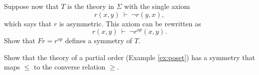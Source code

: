 \begin{exercise} Suppose now that $T$ is the theory in $\Sigma$ with
  the single axiom
  \[ r(x,y)\: \vdash \: \neg r(y,x) ,\] which says that $r$ is
  asymmetric.  This axiom can be rewritten as
  \[ r(x,y)\: \vdash \: \neg r^{op}(x,y) .\] Show that $Fr=r^{op}$
  defines a symmetry of $T$.  \end{exercise}

\begin{exercise} Show that the theory of a partial order (Example
  \ref{ex:poset}) has a symmetry that maps $\leq$ to the converse
  relation $\geq$.  \end{exercise}





